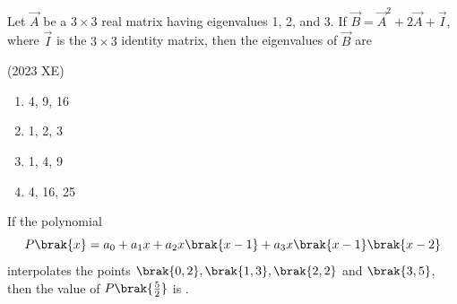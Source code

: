 \item Let $\vec{A}$ be a $3 \times 3$ real matrix having eigenvalues 1, 2, and 3. If $\vec{B}= \vec{A}^2 + 2\vec{A} + \vec{I}$,
where $\vec{I}$ is the $3 \times 3$ identity matrix, then the eigenvalues of $\vec{B}$ are

\hfill(2023 XE)

\begin{multicols}{4}

\begin{enumerate}

\item 4, 9, 16

\item 1, 2, 3

\item 1, 4, 9

\item 4, 16, 25

\end{enumerate}

\end{multicols}
\item If the polynomial
$$P\brak{x} = a_0 + a_1 x + a_2 x\brak{x-1} + a_3 x\brak{x-1}\brak{x-2}$$
interpolates the points $\brak{0,2}, \brak{1,3}, \brak{2,2}$ and $\brak{3,5}$, then the value of $P\brak{\frac{5}{2}}$ is \underline{\hspace{1cm}}.

